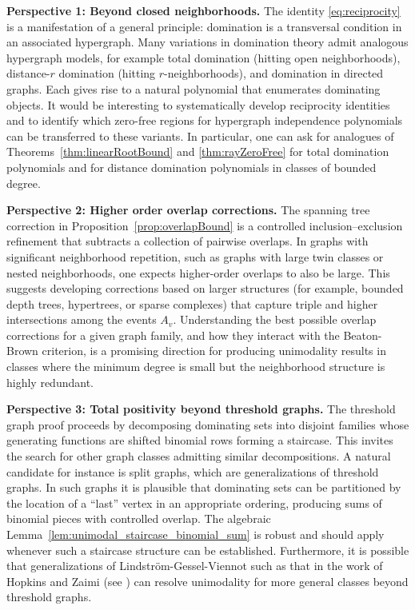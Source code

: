 \documentclass[11pt]{amsart}
\numberwithin{equation}{section}
\begin{document}
\medskip\noindent
\textbf{Perspective 1: Beyond closed neighborhoods.}
The identity \eqref{eq:reciprocity} is a manifestation of a general principle: domination is a transversal condition in an associated hypergraph. Many variations in domination theory admit analogous hypergraph models, for example total domination (hitting open neighborhoods), distance-$r$ domination (hitting $r$-neighborhoods), and domination in directed graphs. Each gives rise to a natural polynomial that enumerates dominating objects. It would be interesting to systematically develop reciprocity identities and to identify which zero-free regions for hypergraph independence polynomials can be transferred to these variants. In particular, one can ask for analogues of Theorems~\ref{thm:linearRootBound} and \ref{thm:rayZeroFree} for total domination polynomials and for distance domination polynomials in classes of bounded degree.

\medskip\noindent
\textbf{Perspective 2: Higher order overlap corrections.}
The spanning tree correction in Proposition~\ref{prop:overlapBound} is a controlled inclusion--exclusion refinement that subtracts a collection of pairwise overlaps. In graphs with significant neighborhood repetition, such as graphs with large twin classes or nested neighborhoods, one expects higher-order overlaps to also be large. This suggests developing corrections based on larger structures (for example, bounded depth trees, hypertrees, or sparse complexes) that capture triple and higher intersections among the events $A_v$. Understanding the best possible overlap corrections for a given graph family, and how they interact with the Beaton-Brown criterion, is a promising direction for producing unimodality results in classes where the minimum degree is small but the neighborhood structure is highly redundant.

\medskip\noindent
\textbf{Perspective 3: Total positivity beyond threshold graphs.}
The threshold graph proof proceeds by decomposing dominating sets into disjoint families whose generating functions are shifted binomial rows forming a staircase. This invites the search for other graph classes admitting similar decompositions. A natural candidate for instance is split graphs, which are generalizations of threshold graphs. In such graphs it is plausible that dominating sets can be partitioned by the location of a ``last'' vertex in an appropriate ordering, producing sums of binomial pieces with controlled overlap. The algebraic Lemma~\ref{lem:unimodal_staircase_binomial_sum} is robust and should apply whenever such a staircase structure can be established. Furthermore, it is possible that generalizations of Lindstr\"{o}m-Gessel-Viennot such as that in the work of Hopkins and Zaimi (see \cite{HopkinsZaimi2023}) can resolve unimodality for more general classes beyond threshold graphs.
\end{document}
